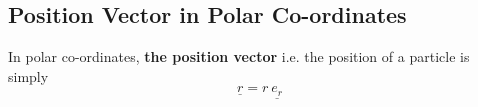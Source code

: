 \subsection{Position Vector in Polar Co-ordinates}

\begin{definition}
	In polar co-ordinates, {\bf the position vector} i.e. the position of a particle is simply
	$$\underline{r} = r\ \underline{e_{r}}$$
\end{definition}
\vspace{4px}
\begin{mycenter}

	\begin{tikzpicture}[x=0.75pt,y=0.75pt,yscale=-1,xscale=1]


\end{tikzpicture}
\end{mycenter}
